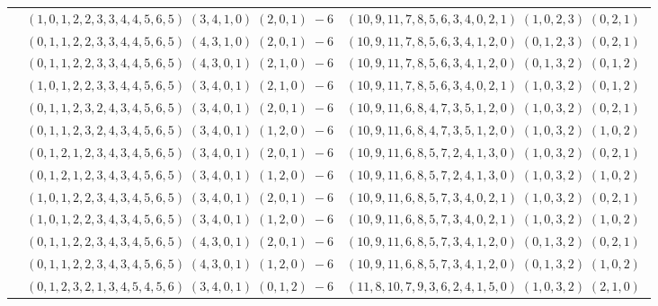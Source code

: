\documentclass[11pt]{article}
\begin{document}
\begin{longtable}[l]{|c|c|c|}
 \cline{2-3} 
 & $(1 ,0 ,1 ,2 ,2 ,3 ,3 ,4 ,4 ,5 ,6 ,5) \;(3 ,4 ,1 ,0) \;(2 ,0 ,1) \;-6$ & $(10 ,9 ,11 ,7 ,8 ,5 ,6 ,3 ,4 ,0 ,2 ,1) \;(1 ,0 ,2 ,3) \;(0 ,2 ,1) \;$\\ 
 \cline{2-3} 
 & $(0 ,1 ,1 ,2 ,2 ,3 ,3 ,4 ,4 ,5 ,6 ,5) \;(4 ,3 ,1 ,0) \;(2 ,0 ,1) \;-6$ & $(10 ,9 ,11 ,7 ,8 ,5 ,6 ,3 ,4 ,1 ,2 ,0) \;(0 ,1 ,2 ,3) \;(0 ,2 ,1) \;$\\ 
 \cline{2-3} 
 & $(0 ,1 ,1 ,2 ,2 ,3 ,3 ,4 ,4 ,5 ,6 ,5) \;(4 ,3 ,0 ,1) \;(2 ,1 ,0) \;-6$ & $(10 ,9 ,11 ,7 ,8 ,5 ,6 ,3 ,4 ,1 ,2 ,0) \;(0 ,1 ,3 ,2) \;(0 ,1 ,2) \;$\\ 
 \cline{2-3} 
 & $(1 ,0 ,1 ,2 ,2 ,3 ,3 ,4 ,4 ,5 ,6 ,5) \;(3 ,4 ,0 ,1) \;(2 ,1 ,0) \;-6$ & $(10 ,9 ,11 ,7 ,8 ,5 ,6 ,3 ,4 ,0 ,2 ,1) \;(1 ,0 ,3 ,2) \;(0 ,1 ,2) \;$\\ 
 \cline{2-3} 
 & $(0 ,1 ,1 ,2 ,3 ,2 ,4 ,3 ,4 ,5 ,6 ,5) \;(3 ,4 ,0 ,1) \;(2 ,0 ,1) \;-6$ & $(10 ,9 ,11 ,6 ,8 ,4 ,7 ,3 ,5 ,1 ,2 ,0) \;(1 ,0 ,3 ,2) \;(0 ,2 ,1) \;$\\ 
 \cline{2-3} 
 & $(0 ,1 ,1 ,2 ,3 ,2 ,4 ,3 ,4 ,5 ,6 ,5) \;(3 ,4 ,0 ,1) \;(1 ,2 ,0) \;-6$ & $(10 ,9 ,11 ,6 ,8 ,4 ,7 ,3 ,5 ,1 ,2 ,0) \;(1 ,0 ,3 ,2) \;(1 ,0 ,2) \;$\\ 
 \cline{2-3} 
 & $(0 ,1 ,2 ,1 ,2 ,3 ,4 ,3 ,4 ,5 ,6 ,5) \;(3 ,4 ,0 ,1) \;(2 ,0 ,1) \;-6$ & $(10 ,9 ,11 ,6 ,8 ,5 ,7 ,2 ,4 ,1 ,3 ,0) \;(1 ,0 ,3 ,2) \;(0 ,2 ,1) \;$\\ 
 \cline{2-3} 
 & $(0 ,1 ,2 ,1 ,2 ,3 ,4 ,3 ,4 ,5 ,6 ,5) \;(3 ,4 ,0 ,1) \;(1 ,2 ,0) \;-6$ & $(10 ,9 ,11 ,6 ,8 ,5 ,7 ,2 ,4 ,1 ,3 ,0) \;(1 ,0 ,3 ,2) \;(1 ,0 ,2) \;$\\ 
 \cline{2-3} 
 & $(1 ,0 ,1 ,2 ,2 ,3 ,4 ,3 ,4 ,5 ,6 ,5) \;(3 ,4 ,0 ,1) \;(2 ,0 ,1) \;-6$ & $(10 ,9 ,11 ,6 ,8 ,5 ,7 ,3 ,4 ,0 ,2 ,1) \;(1 ,0 ,3 ,2) \;(0 ,2 ,1) \;$\\ 
 \cline{2-3} 
 & $(1 ,0 ,1 ,2 ,2 ,3 ,4 ,3 ,4 ,5 ,6 ,5) \;(3 ,4 ,0 ,1) \;(1 ,2 ,0) \;-6$ & $(10 ,9 ,11 ,6 ,8 ,5 ,7 ,3 ,4 ,0 ,2 ,1) \;(1 ,0 ,3 ,2) \;(1 ,0 ,2) \;$\\ 
 \cline{2-3} 
 & $(0 ,1 ,1 ,2 ,2 ,3 ,4 ,3 ,4 ,5 ,6 ,5) \;(4 ,3 ,0 ,1) \;(2 ,0 ,1) \;-6$ & $(10 ,9 ,11 ,6 ,8 ,5 ,7 ,3 ,4 ,1 ,2 ,0) \;(0 ,1 ,3 ,2) \;(0 ,2 ,1) \;$\\ 
 \cline{2-3} 
 & $(0 ,1 ,1 ,2 ,2 ,3 ,4 ,3 ,4 ,5 ,6 ,5) \;(4 ,3 ,0 ,1) \;(1 ,2 ,0) \;-6$ & $(10 ,9 ,11 ,6 ,8 ,5 ,7 ,3 ,4 ,1 ,2 ,0) \;(0 ,1 ,3 ,2) \;(1 ,0 ,2) \;$\\ 
 \cline{2-3} 
 & $(0 ,1 ,2 ,3 ,2 ,1 ,3 ,4 ,5 ,4 ,5 ,6) \;(3 ,4 ,0 ,1) \;(0 ,1 ,2) \;-6$ & $(11 ,8 ,10 ,7 ,9 ,3 ,6 ,2 ,4 ,1 ,5 ,0) \;(1 ,0 ,3 ,2) \;(2 ,1 ,0) \;$\\ 

\end{longtable}
\end{document}
